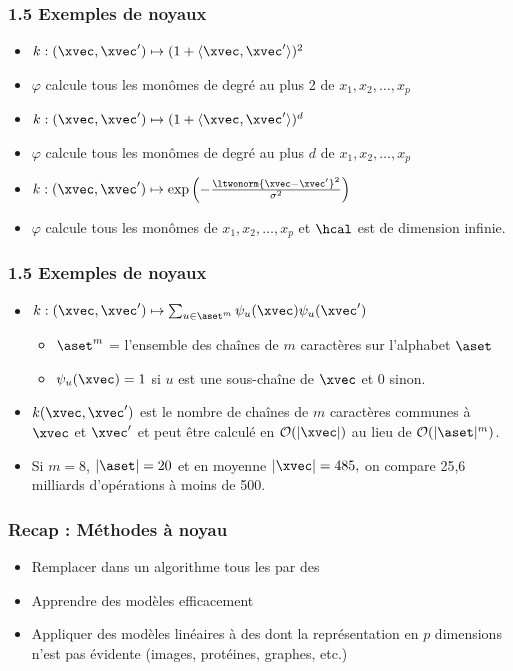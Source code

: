 \begin{frame}
  \frametitle{1.5 Exemples de noyaux}
  \begin{itemize}
  \item {} $k: (\xvec, \xvec^\prime) \mapsto (1 + \langle \xvec, \xvec^\prime \rangle)^2$
  \item[] $\varphi$ calcule tous les monômes de degré au plus 2 de $x_1, x_2, \dots, x_p$ 
    \pause
  \item {} $k: (\xvec, \xvec^\prime) \mapsto (1 + \langle \xvec, \xvec^\prime \rangle)^d$
  \item[] $\varphi$ calcule tous les monômes de degré au plus $d$ de $x_1, x_2, \dots, x_p$ 
    \pause 
  \item {} $k: (\xvec, \xvec^\prime) \mapsto
    \exp\left( - \frac{\ltwonorm{\xvec - \xvec^\prime}^2}{\sigma^2} \right)$
  \item[] $\varphi$ calcule tous les monômes de $x_1, x_2, \dots, x_p$ 
  et $\hcal$ est de dimension infinie. 
  \end{itemize}
\end{frame}

\begin{frame}
  \frametitle{1.5 Exemples de noyaux}
  \begin{itemize}
  \item {} $k: (\xvec, \xvec^\prime) \mapsto
    \sum_{u \in \aset^m} \psi_u(\xvec) \psi_u(\xvec^\prime)$
    \begin{itemize}
    \item $\aset^m$ = l'ensemble des chaînes de $m$ caractères sur l'alphabet $\aset$
    \item $\psi_u(\xvec) = 1$ si $u$ est une sous-chaîne de $\xvec$ et $0$ sinon.
    \end{itemize}
  \pause
  \item $k(\xvec, \xvec^\prime)$ est le nombre de chaînes de $m$ caractères
    communes à $\xvec$ et $\xvec^\prime$ et peut être calculé en
    $\mathcal{O}(|\xvec|)$ au lieu de $\mathcal{O}(|\aset|^m)$.
    \pause
  \item Si $m=8$, $|\aset|=20$ et en moyenne $|\xvec| = 485,$ on compare 25,6 milliards
    d'opérations à moins de 500.
  \end{itemize}
\end{frame}

\begin{frame}
  \frametitle{Recap : Méthodes à noyau}
  \begin{itemize}
  \item {} Remplacer dans un algorithme tous les  par des 
  \item Apprendre des modèles  efficacement
  \item Appliquer des modèles linéaires à des  dont la représentation en $p$ dimensions n'est pas évidente (images, protéines, graphes, etc.)
    
  \end{itemize}
\end{frame}

